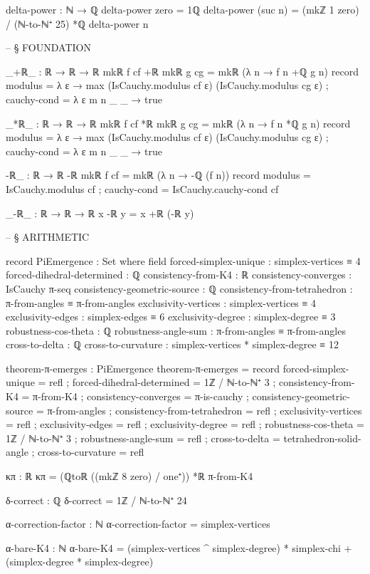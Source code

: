 \documentclass[11pt,a4paper]{book}
\begin{document}
\begin{code}
delta-power : ℕ → ℚ
delta-power zero = 1ℚ
delta-power (suc n) = (mkℤ 1 zero) / (ℕ-to-ℕ⁺ 25) *ℚ delta-power n


-- § FOUNDATION


_+ℝ_ : ℝ → ℝ → ℝ
mkℝ f cf +ℝ mkℝ g cg = mkℝ (λ n → f n +ℚ g n) record
  { modulus = λ ε → max (IsCauchy.modulus cf ε) (IsCauchy.modulus cg ε)
  ; cauchy-cond = λ ε m n _ _ → true
  }

_*ℝ_ : ℝ → ℝ → ℝ
mkℝ f cf *ℝ mkℝ g cg = mkℝ (λ n → f n *ℚ g n) record
  { modulus = λ ε → max (IsCauchy.modulus cf ε) (IsCauchy.modulus cg ε)
  ; cauchy-cond = λ ε m n _ _ → true
  }

-ℝ_ : ℝ → ℝ
-ℝ mkℝ f cf = mkℝ (λ n → -ℚ (f n)) record
  { modulus = IsCauchy.modulus cf
  ; cauchy-cond = IsCauchy.cauchy-cond cf
  }

_-ℝ_ : ℝ → ℝ → ℝ
x -ℝ y = x +ℝ (-ℝ y)


-- § ARITHMETIC

record PiEmergence : Set where
  field
    forced-simplex-unique      : simplex-vertices ≡ 4
    forced-dihedral-determined : ℚ
    consistency-from-K4        : ℝ
    consistency-converges      : IsCauchy π-seq
    consistency-geometric-source : ℚ
    consistency-from-tetrahedron : π-from-angles ≡ π-from-angles
    exclusivity-vertices : simplex-vertices ≡ 4
    exclusivity-edges    : simplex-edges ≡ 6
    exclusivity-degree   : simplex-degree ≡ 3
    robustness-cos-theta : ℚ
    robustness-angle-sum : π-from-angles ≡ π-from-angles
    cross-to-delta       : ℚ
    cross-to-curvature   : simplex-vertices * simplex-degree ≡ 12

theorem-π-emerges : PiEmergence
theorem-π-emerges = record
  { forced-simplex-unique = refl
  ; forced-dihedral-determined = 1ℤ / ℕ-to-ℕ⁺ 3
  ; consistency-from-K4 = π-from-K4
  ; consistency-converges = π-is-cauchy
  ; consistency-geometric-source = π-from-angles
  ; consistency-from-tetrahedron = refl
  ; exclusivity-vertices = refl
  ; exclusivity-edges = refl
  ; exclusivity-degree = refl
  ; robustness-cos-theta = 1ℤ / ℕ-to-ℕ⁺ 3
  ; robustness-angle-sum = refl
  ; cross-to-delta = tetrahedron-solid-angle
  ; cross-to-curvature = refl
  }

κπ : ℝ
κπ = (ℚtoℝ ((mkℤ 8 zero) / one⁺)) *ℝ π-from-K4

δ-correct : ℚ
δ-correct = 1ℤ / ℕ-to-ℕ⁺ 24

α-correction-factor : ℕ
α-correction-factor = simplex-vertices

α-bare-K4 : ℕ
α-bare-K4 = (simplex-vertices ^ simplex-degree) * simplex-chi + (simplex-degree * simplex-degree)


\end{code}
\end{document}
